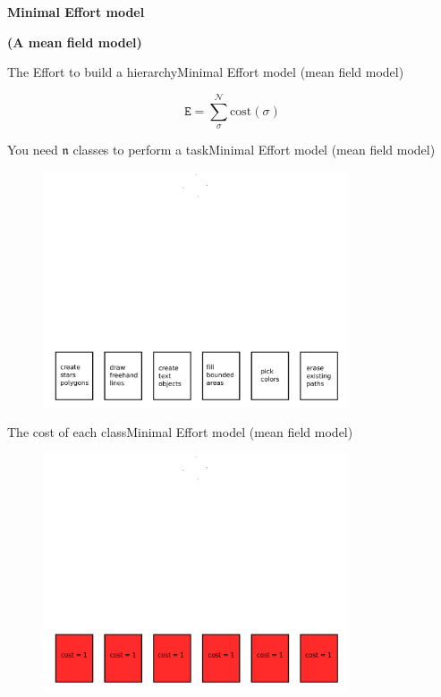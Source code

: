 \documentclass[11pt,svgnames]{beamer}
\newcommand{\Ee}{\mathtt E}
\newcommand{\enne}{\mathfrak n}
\newcommand{\Enne}{\mathcal N}
\begin{document}
\begingroup
{}
\begin{frame}
\center
\textbf {\Huge {\color{white} {Minimal Effort model}}}

\vspace{0.5cm}
\textbf {\large {\color{white} {(A mean field model)}}}
\end{frame}
\endgroup
\begin{frame}[t]{The Effort to build a hierarchy}{Minimal Effort model (mean field model)}
\begin{tcolorbox}[colframe=green]
\[ \Ee = \sum_{\sigma}^{\Enne} \text{cost}(\sigma) \]
\end{tcolorbox}
\end{frame}

\begin{frame}[noframenumbering]{You need $\boldsymbol{\enne}$ classes to perform a task}{Minimal Effort model (mean field model)}
\begin{figure}[H]%
\includegraphics[width=9cm,draft=false]{immagini/a1.pdf}
\end{figure}
\end{frame}

\begin{frame}[noframenumbering]{The cost of each class}{Minimal Effort model (mean field model)}
\begin{figure}[H]%
\includegraphics[width=9cm,draft=false]{immagini/aaa.pdf}
\end{figure}
\end{frame}
\end{document}
